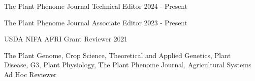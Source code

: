 
\begin{cventries}

  \cventry
    {The Plant Phenome Journal} %
    {Technical Editor} %
    {} %
    {2024 - Present} %
    {}

  \cventry
    {The Plant Phenome Journal} %
    {Associate Editor} %
    {} %
    {2023 - Present} %
    {}

  \cventry
    {USDA NIFA AFRI} %
    {Grant Reviewer} %
    {} %
    {2021} %
    {}
    
  \cventry
    {The Plant Genome, Crop Science, Theoretical and Applied Genetics, Plant Disease, G3, Plant Physiology, The Plant Phenome Journal, Agricultural Systems} %
    {Ad Hoc Reviewer} %
    {} %
    {} %
    {}

\end{cventries}
